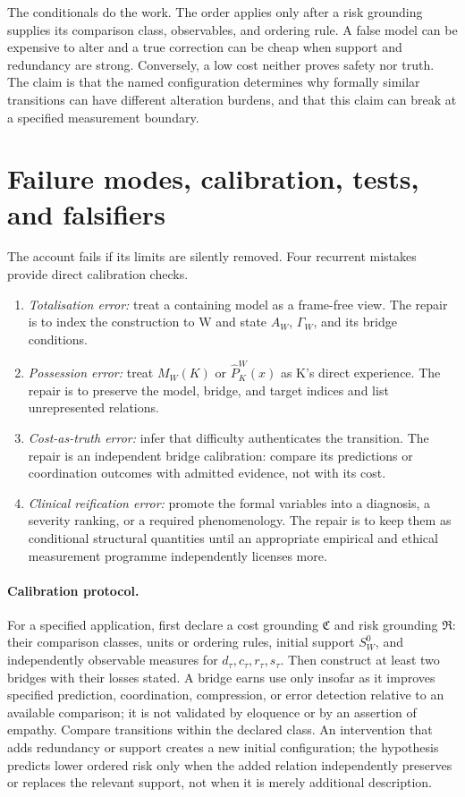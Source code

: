 \documentclass[11pt,a4paper]{article}
\theoremstyle{remark}
\begin{document}
The conditionals do the work. The order applies only after a risk grounding
supplies its comparison class, observables, and ordering rule. A false model can
be expensive to alter and a true correction can be cheap when support and
redundancy are strong. Conversely, a low cost neither proves safety nor truth.
The claim is that the named configuration determines why formally similar
transitions can have different alteration burdens, and that this claim can break
at a specified measurement boundary.

\section{Failure modes, calibration, tests, and falsifiers}\label{sec:tests}
The account fails if its limits are silently removed. Four recurrent mistakes
provide direct calibration checks.
\begin{enumerate}[leftmargin=*]
\item \emph{Totalisation error:} treat a containing model as a frame-free view.
The repair is to index the construction to W and state $A_W$, $\Gamma_W$, and
its bridge conditions.
\item \emph{Possession error:} treat $M_W(K)$ or $\widehat P^W_K(x)$ as K's
direct experience. The repair is to preserve the model, bridge, and target
indices and list unrepresented relations.
\item \emph{Cost-as-truth error:} infer that difficulty authenticates the
transition. The repair is an independent bridge calibration: compare its
predictions or coordination outcomes with admitted evidence, not with its cost.
\item \emph{Clinical reification error:} promote the formal variables into a
diagnosis, a severity ranking, or a required phenomenology. The repair is to
keep them as conditional structural quantities until an appropriate empirical
and ethical measurement programme independently licenses more.
\end{enumerate}

\paragraph{Calibration protocol.} For a specified application, first declare a
cost grounding $\mathfrak C$ and risk grounding $\mathfrak R$: their comparison
classes, units or ordering rules, initial support $S_W^0$, and independently
observable measures for $d_\tau,c_\tau,r_\tau,s_\tau$. Then construct at least
two bridges with their losses stated. A bridge earns use only insofar as it
improves specified prediction, coordination, compression, or error detection
relative to an available comparison; it is not validated by eloquence or by an
assertion of empathy. Compare transitions within the declared class. An
intervention that adds redundancy or support creates a new initial configuration;
the hypothesis predicts lower ordered risk only when the added relation
independently preserves or replaces the relevant support, not when it is merely
additional description.
\end{document}
